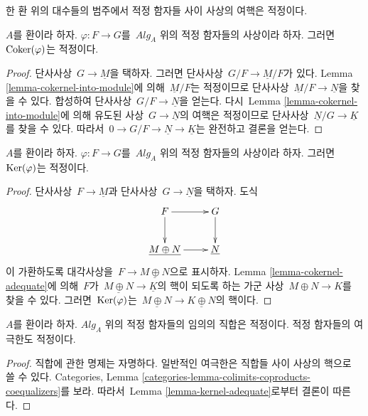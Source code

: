 \begin{lemma}
\label{lemma-cokernel-adequate}
\begin{slogan}
한 환 위의 대수들의 범주에서 적정 함자들 사이 사상의 여핵은 적정이다.
\end{slogan}
$A$를 환이라 하자.
$\varphi : F \to G$를\  $\textit{Alg}_A$ 위의 적정 함자들의 사상이라
하자. 그러면\  $\mathop{\mathrm{Coker}}(\varphi)$는 적정이다.
\end{lemma}

\begin{proof}
단사사상\  $G \to \underline{M}$을 택하자. 그러면 단사사상\ 
$G/F \to \underline{M}/F$가 있다. Lemma
\ref{lemma-cokernel-into-module}에 의해\  $\underline{M}/F$는 적정이므로
단사사상\  $\underline{M}/F \to \underline{N}$을 찾을 수 있다.
합성하여 단사사상\  $G/F \to \underline{N}$을 얻는다. 다시\  Lemma
\ref{lemma-cokernel-into-module}에 의해 유도된 사상\ 
$G \to \underline{N}$의 여핵은 적정이므로 단사사상\ 
$\underline{N}/G \to \underline{K}$를 찾을 수 있다. 따라서\ 
$0 \to G/F \to \underline{N} \to \underline{K}$는 완전하고 결론을
얻는다.
\end{proof}

\begin{lemma}
\label{lemma-kernel-adequate}
$A$를 환이라 하자.
$\varphi : F \to G$를\  $\textit{Alg}_A$ 위의 적정 함자들의 사상이라
하자. 그러면\  $\mathop{\mathrm{Ker}}(\varphi)$는 적정이다.
\end{lemma}

\begin{proof}
단사사상\  $F \to \underline{M}$과 단사사상\ 
$G \to \underline{N}$을 택하자. 도식
$$
\xymatrix{
F \ar[d] \ar[r] & G \ar[d] \\
\underline{M \oplus N} \ar[r] & \underline{N}
}
$$
이 가환하도록 대각사상을\  $F \to \underline{M \oplus N}$으로
표시하자. Lemma \ref{lemma-cokernel-adequate}에 의해\ 
$F$가\  $\underline{M \oplus N} \to \underline{K}$의 핵이 되도록 하는
가군 사상\  $M \oplus N \to K$를 찾을 수 있다. 그러면\ 
$\mathop{\mathrm{Ker}}(\varphi)$는\ 
$\underline{M \oplus N} \to \underline{K \oplus N}$의 핵이다.
\end{proof}

\begin{lemma}
\label{lemma-colimit-adequate}
$A$를 환이라 하자. $\textit{Alg}_A$ 위의 적정 함자들의 임의의 직합은
적정이다. 적정 함자들의 여극한도 적정이다.
\end{lemma}

\begin{proof}
직합에 관한 명제는 자명하다. 일반적인 여극한은 직합들 사이 사상의
핵으로 쓸 수 있다. Categories, Lemma
\ref{categories-lemma-colimits-coproducts-coequalizers}를 보라. 따라서\ 
Lemma \ref{lemma-kernel-adequate}로부터 결론이 따른다.
\end{proof}

